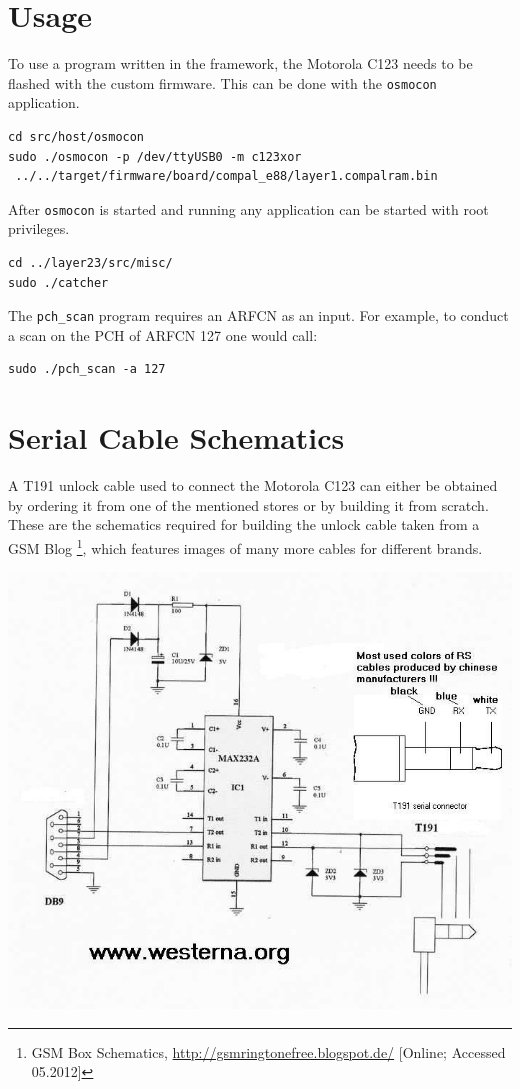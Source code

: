 \section{Usage}
\label{sec:osmo_usage}
To use a program written in the framework, the Motorola C123 needs to be flashed with the custom firmware.
This can be done with the \texttt{osmocon} application. 
\begin{verbatim}
cd src/host/osmocon
sudo ./osmocon -p /dev/ttyUSB0 -m c123xor
 ../../target/firmware/board/compal_e88/layer1.compalram.bin
\end{verbatim}
After \texttt{osmocon} is started and running any application can be started with root privileges.
\begin{verbatim}
cd ../layer23/src/misc/
sudo ./catcher
\end{verbatim}
The \texttt{pch\_scan} program requires an ARFCN as an input.
For example, to conduct a scan on the PCH of ARFCN 127 one would call:
\begin{verbatim}
sudo ./pch_scan -a 127
\end{verbatim}
\newpage
\section{Serial Cable Schematics}
\label{sec:osmo_serial_schematics}
A T191 unlock cable used to connect the Motorola C123 can either be obtained by ordering it from one of the mentioned stores or by building it from scratch.
These are the schematics required for building the unlock cable taken from a GSM Blog \footnote{GSM Box Schematics, \url{http://gsmringtonefree.blogspot.de/} [Online; Accessed 05.2012]}, which features images of many more cables for different brands.
\vfill
\begin{center}
\includegraphics[width=.9\textwidth]{../Images/t191cable}
\end{center}
\vfill
